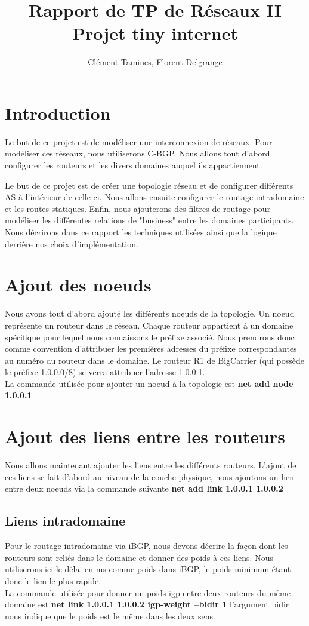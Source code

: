\documentclass[11pt,a4paper]{article}
\begin{document}
\title{Rapport de TP de Réseaux II \\ Projet tiny internet}
\author{Clément Tamines, Florent Delgrange}
\maketitle


\section{Introduction}
Le but de ce projet est de modéliser une interconnexion de réseaux. Pour modéliser ces réseaux, nous utiliserons C-BGP. Nous allons tout d'abord configurer les routeurs et les divers domaines auquel ils appartiennent.


Le but de ce projet est de créer une topologie réseau et de configurer différents AS à l'intérieur de celle-ci. Nous allons ensuite configurer le routage intradomaine et les routes statiques. Enfin, nous ajouterons des filtres de routage pour modéliser les différentes relations de "business" entre les domaines participants. Nous décrirons dans ce rapport les techniques utilisées ainsi que la logique derrière nos choix d'implémentation.

\section{Ajout des noeuds}
Nous avons tout d'abord ajouté les différents noeuds de la topologie. Un noeud représente un routeur dans le réseau. Chaque routeur appartient à un domaine spécifique pour lequel nous connaissons le préfixe associé. Nous prendrons donc comme convention d'attribuer les  premières adresses du préfixe correspondantes au numéro du routeur dans le domaine. Le routeur R1 de BigCarrier (qui possède le préfixe 1.0.0.0/8) se verra attribuer l'adresse 1.0.0.1.\\
La commande utilisée pour ajouter un noeud à la topologie est \textbf{net add node 1.0.0.1}.

\section{Ajout des liens entre les routeurs}
Nous allons maintenant ajouter les liens entre les différents routeurs. L'ajout de ces liens se fait d'abord au niveau de la couche physique, nous ajoutons un lien entre deux noeuds via la commande suivante \textbf{net add link 1.0.0.1 1.0.0.2}
\subsection{Liens intradomaine}
Pour le routage intradomaine via iBGP, nous devons décrire la façon dont les routeurs sont reliés dans le domaine et donner des poids à ces liens. Nous utiliserons ici le délai en ms comme poids dans iBGP, le poids minimum étant donc le lien le plus rapide.\\
La commande utilisée pour donner un poids igp entre deux routeurs du même domaine est \textbf{net link 1.0.0.1 1.0.0.2 igp-weight --bidir 1} l'argument bidir nous indique que le poids est le même dans les deux sens.
\end{document}
